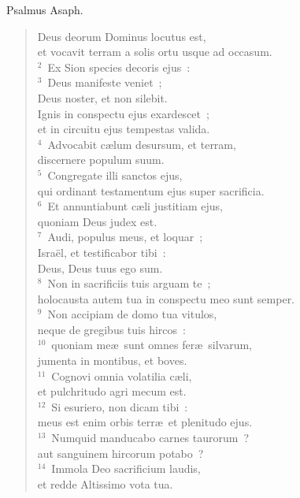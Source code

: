 \bchapter
\lettrine[lines=3,image=true,loversize=0.05,lraise=-0.03]{P}{}salmus Asaph. \begin{flushleft}\begin{verse}\vspace{6pt}Deus deorum Dominus locutus est,\\ et vocavit terram a solis ortu usque ad occasum.\\
${}^{2}$~Ex Sion species decoris ejus~:\\
${}^{3}$~Deus manifeste veniet~;\\ Deus noster, et non silebit.\\ Ignis in conspectu ejus exardescet~;\\ et in circuitu ejus tempestas valida.\\
${}^{4}$~Advocabit c\ae lum desursum, et terram,\\ discernere populum suum.\\
${}^{5}$~Congregate illi sanctos ejus,\\ qui ordinant testamentum ejus super sacrificia.\\
${}^{6}$~Et annuntiabunt c\ae li justitiam ejus,\\ quoniam Deus judex est.\\
${}^{7}$~Audi, populus meus, et loquar~;\\ Isra\"el, et testificabor tibi~:\\ Deus, Deus tuus ego sum.\\
${}^{8}$~Non in sacrificiis tuis arguam te~;\\ holocausta autem tua in conspectu meo sunt semper.\\
${}^{9}$~Non accipiam de domo tua vitulos,\\ neque de gregibus tuis hircos~:\\
${}^{10}$~quoniam me\ae\ sunt omnes fer\ae\ silvarum,\\ jumenta in montibus, et boves.\\
${}^{11}$~Cognovi omnia volatilia c\ae li,\\ et pulchritudo agri mecum est.\\
${}^{12}$~Si esuriero, non dicam tibi~:\\ meus est enim orbis terr\ae\ et plenitudo ejus.\\
${}^{13}$~Numquid manducabo carnes taurorum~?\\ aut sanguinem hircorum potabo~?\\
${}^{14}$~Immola Deo sacrificium laudis,\\ et redde Altissimo vota tua.\\

\end{verse}
\end{flushleft}
